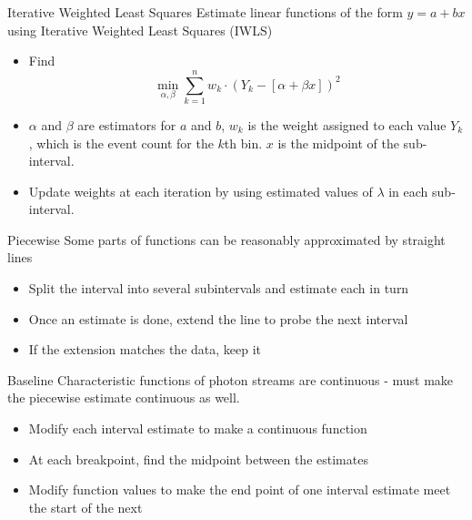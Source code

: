 \documentclass{beamer}
\begin{document}
\begin{frame}{Iterative Weighted Least Squares}
  Estimate linear functions of the form $y=a+bx$ using Iterative Weighted Least Squares (IWLS)
  \begin{itemize}[<+->]
  \item Find \[\min_{\alpha,\beta}\sum_{k=1}^{n}w_k\cdot(Y_k-[\alpha+\beta x])^2\]
  \item $\alpha$ and $\beta$ are estimators for $a$ and $b$, $w_k$ is the weight assigned to each value $Y_k$, which is the event count for the $k$th bin. $x$ is the midpoint of the sub-interval.
  \item Update weights at each iteration by using estimated values of $\lambda$ in each sub-interval.
  \end{itemize}
\end{frame}

\begin{frame}{Piecewise}
  Some parts of functions can be reasonably approximated by straight lines
  \begin{itemize}[<+->]
  \item Split the interval into several subintervals and estimate each in turn
  \item Once an estimate is done, extend the line to probe the next interval
  \item If the extension matches the data, keep it
  \end{itemize}
\end{frame}

\begin{frame}{Baseline}
  Characteristic functions of photon streams are continuous - must make the
  piecewise estimate continuous as well.
  \begin{itemize}[<+->]
  \item Modify each interval estimate to make a continuous function
  \item At each breakpoint, find the midpoint between the estimates
  \item Modify function values to make the end point of one interval
    estimate meet the start of the next
  \end{itemize}
\end{frame}
\end{document}
